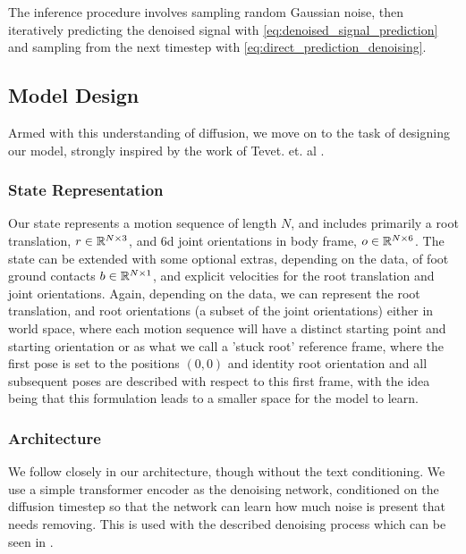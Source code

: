The inference procedure involves sampling random Gaussian noise, then iteratively predicting the denoised signal with \eqref{eq:denoised_signal_prediction} and sampling from the next timestep with \eqref{eq:direct_prediction_denoising}.

\subsection{Model Design}
\label{sec:disney_motion_diffusion}
Armed with this understanding of diffusion, we move on to the task of designing our model, strongly inspired by the work of Tevet. et. al \cite{MDM}.


\subsubsection{State Representation}
\label{sec:diffusion_state_representation}
Our state represents a motion sequence of length $N$, and includes primarily a root translation, $r \in \mathbb{R}^{N \times 3}$, and 6d \cite{aa_6d_angles} joint orientations in body frame, $o \in \mathbb{R}^{N \times 6}$. The state can be extended with some optional extras, depending on the data, of foot ground contacts $b \in \mathbb{R}^{N \times 1}$, and explicit velocities for the root translation and joint orientations. Again, depending on the data, we can represent the root translation, and root orientations (a subset of the joint orientations) either in world space, where each motion sequence will have a distinct starting point and starting orientation or as what we call a 'stuck root' reference frame, where the first pose is set to the positions $(0,0)$ and identity root orientation and all subsequent poses are described with respect to this first frame, with the idea being that this formulation leads to a smaller space for the model to learn.


\subsubsection{Architecture}
We follow closely \cite{MDM} in our architecture, though without the text conditioning. We use a simple transformer \cite{vaswani2017attention} encoder as the denoising network, conditioned on the diffusion timestep so that the network can learn how much noise is present that needs removing. This is used with the described denoising process which can be seen in .

